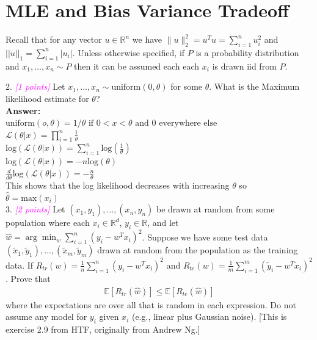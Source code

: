 \documentclass{article}
\newcommand{\1}{\mathbf{1}}
\def\E{\mathbb{E}}
\def\R{\mathbb{R}}
\newcommand{\grade}[1]{\small\textcolor{magenta}{\emph{[#1 points]}} \normalsize}
\begin{document}
\section{MLE and Bias Variance Tradeoff}
Recall that for any vector $u \in \R^n$ we have $\|u\|_2^2 = u^T u = \sum_{i=1}^n u_i^2$ and $||u||_1 = \sum_{i=1}^n |u_i|$. 
Unless otherwise specified, if $P$ is a probability distribution and $x_1,\dots,x_n \sim P$ then it can be assumed each each $x_i$ is drawn iid from $P$. 

2. \grade{1}  Let $x_1,\dots,x_n \sim \text{uniform}(0,\theta)$ for some $\theta$. What is the Maximum likelihood estimate for $\theta$?\\

\textbf{Answer:}\\

$\text{uniform}(o,\theta)= 1/\theta \text{ if } 0<x<\theta \text{ and } 0 \text{ everywhere else}$\\

$\mathcal{L}(\theta | x)= \prod_{i=1}^n \frac{1}{\theta}$\\
$\text{log}(\mathcal{L}(\theta | x))= \sum_{i=1}^n \text{log}(\frac{1}{\theta})$\\
$\text{log}(\mathcal{L}(\theta | x))= -n \text{log}({\theta})$\\
$\frac{d}{d\theta} \text{log}(\mathcal{L}(\theta | x))= -\frac{n}{\theta}$\\
This shows that the log likelihood decreases with increasing $\theta$ so\\
$\widehat{\theta}=\text{max}(x_i)$\\

3. \grade{2} Let $(x_1,y_1),\dots,(x_n,y_n)$ be drawn at random from some population where each $x_i \in \R^d$, $y_i \in \R$, and let $\widehat{w} = \arg\min_w \sum_{i=1}^n (y_i - w^T x_i)^2$.
Suppose we have some test data $(\widetilde{x}_1,\widetilde{y}_1),\dots,(\widetilde{x}_m,\widetilde{y}_m)$ drawn at random from the population as the training data. 
If $R_{tr}(w) = \frac{1}{n} \sum_{i=1}^n (y_i - w^T x_i)^2$ and $R_{te}(w) = \frac{1}{m} \sum_{i=1}^m (\widetilde{y}_i - w^T \widetilde{x}_i)^2$. Prove that 
\begin{align*}
\E[ R_{tr}(\widehat{w}) ] \leq \E[ R_{te}(\widehat{w}) ]
\end{align*}
where the expectations are over all that is random in each expression. Do not assume any model for $y_i$ given $x_i$ (e.g., linear plus Gaussian noise). [This is exercise 2.9 from HTF, originally from Andrew Ng.]\\
\end{document}
